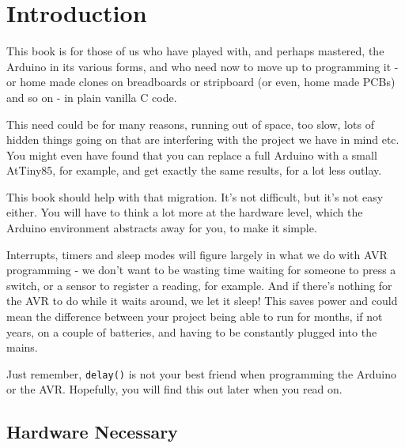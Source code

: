 \section*{Introduction}\label{introduction}

This book is for those of us who have played with, and perhaps mastered, the Arduino in its various forms, and who need now to move up to programming it - or home made clones on breadboards or stripboard (or even, home made PCBs) and so on - in plain vanilla C code.

This need could be for many reasons, running out of space, too slow, lots of hidden things going on that are interfering with the project we have in mind etc. You might even have found that you can replace a full Arduino with a small AtTiny85, for example, and get exactly the same results, for a lot less outlay.

This book should help with that migration. It's not difficult, but it's not easy either. You will have to think a lot more at the hardware level, which the Arduino environment abstracts away for you, to make it simple.

Interrupts, timers and sleep modes will figure largely in what we do with AVR programming - we don't want to be wasting time waiting for someone to press a switch, or a sensor to register a reading, for example. And if there's nothing for the AVR to do while it waits around, we let it sleep! This saves power and could mean the difference between your project being able to run for months, if not years, on a couple of batteries, and having to be constantly plugged into the mains.

Just remember, \texttt{delay()} is not your best friend when programming the Arduino or the AVR. Hopefully, you will find this out later when you read on.

\subsection*{Hardware Necessary}\label{hardware-necessary}

